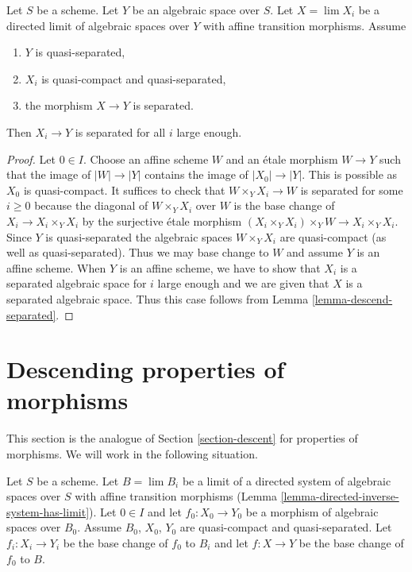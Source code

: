 \begin{lemma}
\label{lemma-eventually-separated}
Let $S$ be a scheme. Let $Y$ be an algebraic space over $S$.
Let $X = \lim X_i$ be a directed limit of algebraic spaces over $Y$
with affine transition morphisms. Assume
\begin{enumerate}
\item $Y$ is quasi-separated,
\item $X_i$ is quasi-compact and quasi-separated,
\item the morphism $X \to Y$ is separated.
\end{enumerate}
Then $X_i \to Y$ is separated for all $i$ large enough.
\end{lemma}

\begin{proof}
Let $0 \in I$. Choose an affine scheme $W$ and an \'etale morphism
$W \to Y$ such that the image of $|W| \to |Y|$ contains the image of
$|X_0| \to |Y|$. This is possible as $X_0$ is quasi-compact.
It suffices to check that $W \times_Y X_i \to W$ is separated
for some $i \geq 0$ because the diagonal of $W \times_Y X_i$
over $W$ is the base change of $X_i \to X_i \times_Y X_i$ by
the surjective \'etale morphism $(X_i \times_Y X_i) \times_Y W \to
X_i \times_Y X_i$. Since $Y$ is quasi-separated the algebraic spaces
$W \times_Y X_i$ are quasi-compact (as well as quasi-separated).
Thus we may base change to $W$ and assume $Y$ is an affine scheme.
When $Y$ is an affine scheme, we have to show that $X_i$ is a
separated algebraic space for $i$ large enough and we are given that
$X$ is a separated algebraic space. Thus this case follows from
Lemma \ref{lemma-descend-separated}.
\end{proof}












\section{Descending properties of morphisms}
\label{section-descent-of-properties}

\noindent
This section is the analogue of Section \ref{section-descent}
for properties of morphisms. We will work in the following situation.

\begin{situation}
\label{situation-descent-property}
Let $S$ be a scheme. Let $B = \lim B_i$ be a limit of a directed system
of algebraic spaces over $S$ with affine transition morphisms
(Lemma \ref{lemma-directed-inverse-system-has-limit}).
Let $0 \in I$ and let $f_0 : X_0 \to Y_0$ be a morphism of algebraic spaces
over $B_0$. Assume $B_0$, $X_0$, $Y_0$ are quasi-compact and quasi-separated.
Let $f_i : X_i \to Y_i$ be the base change of $f_0$ to $B_i$ and
let $f : X \to Y$ be the base change of $f_0$ to $B$.
\end{situation}

